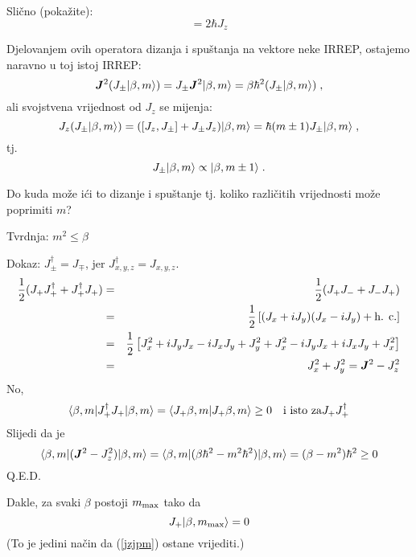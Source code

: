 Slično (pokažite):
\begin{displaymath}
 [J_+, J_-] = 2 \hbar J_z
\end{displaymath}

 Djelovanjem ovih operatora dizanja i spuštanja na vektore neke IRREP,
ostajemo naravno u toj istoj IRREP:
\begin{displaymath}
   \jsq(J_{\pm}\ket{\beta, m})=J_{\pm}\jsq\ket{\beta, m}=\beta\hbar^2
    (J_{\pm}\ket{\beta, m}) \;,
\end{displaymath}
ali svojstvena vrijednost od $J_z$ se mijenja:
\begin{equation}
J_z(J_{\pm}| \beta, m \rangle)=([J_z,J_{\pm}]+J_{\pm}J_z)| \beta, m \rangle=
\hbar(m\pm 1)J_{\pm}| \beta, m \rangle \;,
\label{jzjpm}
\end{equation}
tj.
\begin{displaymath}
    J_{\pm}| \beta, m \rangle\propto | \beta, m\pm 1 \rangle \;.
\end{displaymath}


Do kuda  može ići to dizanje i spuštanje tj. koliko različitih vrijednosti
može poprimiti $m$?

Tvrdnja: $m^2 \leq \beta$

Dokaz: $J_{\pm}^{\dagger}=J_{\mp}$, jer $J^{\dagger}_{x,y,z}=J_{x,y,z}$.
\begin{eqnarray*}
 \frac{1}{2}(J_+ J_{+}^{\dagger} + J_{+}^{\dagger}J_+)& = &
 \frac{1}{2}(J_+ J_{-}+ J_- J_+) \\
& = & \frac{1}{2} \left[ (J_x + i J_y)(J_x - i J_y) + \textrm{h. c.} \right]
\\ & = & \frac{1}{2} \left[ J_{x}^2 + i J_y J_x - i J_x J_y + J_{y}^2
  + J_{x}^2 - i J_y J_x + i J_x J_y + J_{x}^2 \right] \\
& = & J_{x}^2 + J_{y}^2 = \jsq - J_{z}^2
\end{eqnarray*}
No,
\begin{displaymath}
\langle \beta, m |J_{+}^{\dagger}J_+ | \beta, m \rangle =
\langle J_{+}\beta, m |J_{+}\beta, m\rangle  \geq 0 \quad \textrm{i isto za}
J_+ J_{+}^{\dagger}
\end{displaymath}
Slijedi da je
\begin{displaymath}
\bra{\beta, m}(\jsq - J_{z}^2)\ket{\beta, m}=
\bra{\beta, m}(\beta\hbar^2 - m^2\hbar^2)\ket{\beta, m} =
(\beta - m^2)\hbar^2 \geq 0
\end{displaymath}
Q.E.D.

Dakle, za svaki $\beta$ postoji $m_{\textrm{\scriptsize max}}$ tako da 
\begin{displaymath}
 J_+ | \beta, m_{\textrm{\scriptsize max}} \rangle = 0
\end{displaymath}
(To je jedini način da (\ref{jzjpm}) ostane vrijediti.)

